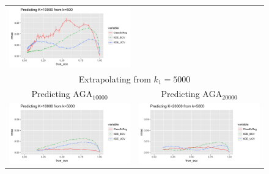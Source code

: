 \documentclass[twoside,11pt]{article}
\newenvironment{myfont}{\fontfamily{phv}\selectfont}{\par}
\begin{document}
\begin{figure}[p]
\begin{tabular}{cc}
\includegraphics[scale = 0.5, clip = true, trim = 0 0 0 0.45in]{sim_large7_K10_k0_5.png}\\ 
\multicolumn{2}{c}{\begin{myfont}Extrapolating from $k_1 = 5000$\end{myfont}}\\
\begin{myfont}Predicting $\text{AGA}_{10000}$\end{myfont} &
\begin{myfont}Predicting $\text{AGA}_{20000}$\end{myfont}\\
\includegraphics[scale = 0.5, clip = true, trim = 0 0 1.25in 0.45in]{sim_large7_K10_k5.png} &
\includegraphics[scale = 0.5, clip = true, trim = 0 0 0 0.45in]{sim_large7_K20_k5.png}\\

\end{tabular}
\end{figure}
\end{document}
